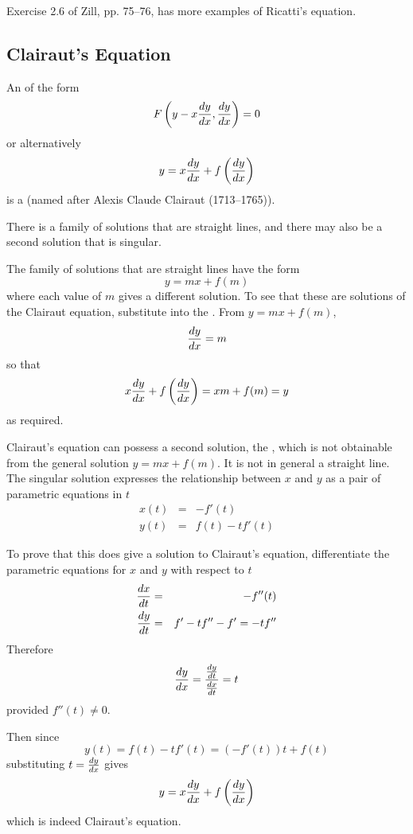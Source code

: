 \begin{exercise}
Exercise 2.6 of Zill, pp. 75--76, has more examples of Ricatti's equation.
\end{exercise}

\subsection{Clairaut's Equation}
\label{ode sec:clairaut}

An \ODE of the form
$$F\left(y-x\frac{dy}{dx},\frac{dy}{dx}\right)=0$$
or alternatively
$$y=x\frac{dy}{dx}+f\left(\frac{dy}{dx}\right)$$
is a  (named after Alexis Claude Clairaut
(1713--1765)). 

There is a family of solutions that are straight lines, and there may also
be a second solution that is singular.

The family of solutions that are straight lines have the form
$$y=mx+f(m)$$
where each value of $m$ gives a different solution.  To see that these are
solutions of the Clairaut equation, substitute into the \ODE.
From $y=mx+f(m)$, 
$$\frac{dy}{dx}=m$$
so that
$$x\frac{dy}{dx}+f\left(\frac{dy}{dx}\right)=xm+f(m)=y$$
as required.

Clairaut's equation can possess a second solution, the , which is not obtainable from the general solution
$y=mx+f(m)$.  It is not in general a straight line.  The singular solution
expresses the relationship between $x$ and $y$ as a pair of
parametric equations in $t$
\begin{eqnarray*}
x(t)&=&-f'(t)\\
y(t)&=&f(t)-tf'(t)
\end{eqnarray*}

To prove that this does give a solution to Clairaut's equation,
differentiate the parametric equations for $x$ and $y$ with respect to $t$
\begin{eqnarray*}
\frac{dx}{dt}&=&-f''(t)\\
\frac{dy}{dt}&=&f'-tf''-f'=-tf''
\end{eqnarray*}
Therefore
$$\frac{dy}{dx}=\frac{\frac{dy}{dt}}{\frac{dx}{dt}}=t$$
provided $f''(t)\neq 0$.

Then since
$$y(t)=f(t)-tf'(t)=(-f'(t))t+f(t)$$
substituting $t=\frac{dy}{dx}$ gives
$$y=x\frac{dy}{dx}+f\left(\frac{dy}{dx}\right)$$
which is indeed Clairaut's equation.

